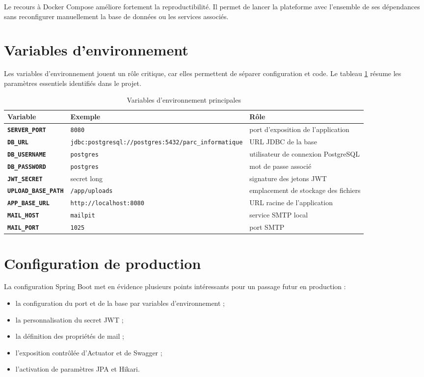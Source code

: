 Le recours à Docker Compose améliore fortement la reproductibilité. Il permet de lancer la plateforme avec l'ensemble de ses dépendances sans reconfigurer manuellement la base de données ou les services associés.

\section{Variables d'environnement}
Les variables d'environnement jouent un rôle critique, car elles permettent de séparer configuration et code. Le tableau \ref{tab:variables-env} résume les paramètres essentiels identifiés dans le projet.

\begin{table}[H]
\centering
\caption{Variables d'environnement principales}
\label{tab:variables-env}
\begin{tabularx}{\textwidth}{>{\bfseries}p{3.7cm}p{3cm}X}
\toprule
Variable & Exemple & Rôle \\
\midrule
\texttt{SERVER\_PORT} & \texttt{8080} & port d'exposition de l'application \\
\texttt{DB\_URL} & \texttt{jdbc:postgresql://postgres:5432/parc\_informatique} & URL JDBC de la base \\
\texttt{DB\_USERNAME} & \texttt{postgres} & utilisateur de connexion PostgreSQL \\
\texttt{DB\_PASSWORD} & \texttt{postgres} & mot de passe associé \\
\texttt{JWT\_SECRET} & secret long & signature des jetons JWT \\
\texttt{UPLOAD\_BASE\_PATH} & \texttt{/app/uploads} & emplacement de stockage des fichiers \\
\texttt{APP\_BASE\_URL} & \texttt{http://localhost:8080} & URL racine de l'application \\
\texttt{MAIL\_HOST} & \texttt{mailpit} & service SMTP local \\
\texttt{MAIL\_PORT} & \texttt{1025} & port SMTP \\
\bottomrule
\end{tabularx}
\end{table}

\section{Configuration de production}
La configuration Spring Boot met en évidence plusieurs points intéressants pour un passage futur en production :
\begin{itemize}
  \item la configuration du port et de la base par variables d'environnement ;
  \item la personnalisation du secret JWT ;
  \item la définition des propriétés de mail ;
  \item l'exposition contrôlée d'Actuator et de Swagger ;
  \item l'activation de paramètres JPA et Hikari.
\end{itemize}

